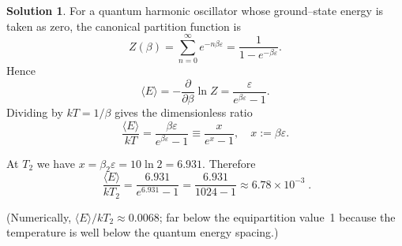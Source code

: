 \documentclass[12pt]{article}
\theoremstyle{definition} %
\newtheorem{solution}{Solution}
\theoremstyle{plain} %
\begin{document}
\begin{solution}
      For a quantum harmonic oscillator whose ground–state energy
      is taken as zero, the canonical partition function is
      \[
      Z(\beta)=\sum_{n=0}^{\infty}e^{-n\beta\varepsilon}
              =\frac1{1-e^{-\beta\varepsilon}}.
      \]
      Hence
      \[
      \langle E\rangle
         = -\frac{\partial}{\partial\beta}\ln Z
         = \frac{\varepsilon}{e^{\beta\varepsilon}-1}.
      \]
      Dividing by \(kT=1/\beta\) gives the dimensionless ratio
      \[
      \frac{\langle E\rangle}{kT}
         = \frac{\beta\varepsilon}{e^{\beta\varepsilon}-1}
         \equiv \frac{x}{e^{x}-1},
         \quad x:=\beta\varepsilon.
      \]
      
      At \(T_2\) we have \(x = \beta_2\varepsilon = 10\ln 2 = 6.931\).
      Therefore
      \[
      \boxed{\;
      \frac{\langle E\rangle}{kT_2}
        = \frac{6.931}{e^{6.931}-1}
        = \frac{6.931}{1024-1}
        \approx 6.78\times10^{-3}
      \;} .
      \]
      
      (Numerically, \(\langle E\rangle/kT_2 \approx 0.0068\); far below the
      equipartition value~1 because the temperature is well below the
      quantum energy spacing.)
      \end{solution}
\end{document}
